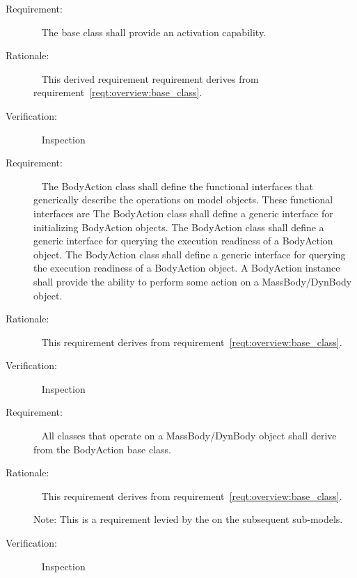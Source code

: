 \label{reqt:BodyAction:active}
\begin{description}
\item[Requirement:]\ \newline
  The \ModelDesc base class shall
  provide an activation capability.
\item[Rationale:]\ \newline
  This derived requirement requirement derives
  from requirement~\ref{reqt:overview:base_class}.
\item[Verification:]\ \newline
  Inspection
\end{description}

\label{reqt:BodyAction:virtual_methods}
\begin{description}
\item[Requirement:]\ \newline
  The BodyAction class shall define the functional interfaces
  that generically describe the operations on model objects.
  These functional interfaces are
  \label{reqt:BodyAction:initialize}
  The BodyAction class shall define a generic interface
  for initializing BodyAction objects.
  \label{reqt:BodyAction:is_ready}
  The BodyAction class shall define a generic interface
  for querying the execution readiness of a BodyAction object.
  \label{reqt:BodyAction:apply}
  The BodyAction class shall define a generic interface
  for querying the execution readiness of a BodyAction object.
  A BodyAction instance shall provide the ability to
  perform some action on a MassBody/DynBody object.
\item[Rationale:]\ \newline
  This requirement derives from requirement~\ref{reqt:overview:base_class}.
\item[Verification:]\ \newline
  Inspection
\end{description}

\label{reqt:BodyAction:base_class_mandate}
\begin{description}
\item[Requirement:]\ \newline
  All \ModelDesc classes that operate on a MassBody/DynBody object
  shall derive from the BodyAction base class.
\item[Rationale:]\ \newline
  This requirement derives from requirement~\ref{reqt:overview:base_class}.

  Note: This is a requirement levied by the \partxname on the
  subsequent sub-models.
\item[Verification:]\ \newline
  Inspection
\end{description}


